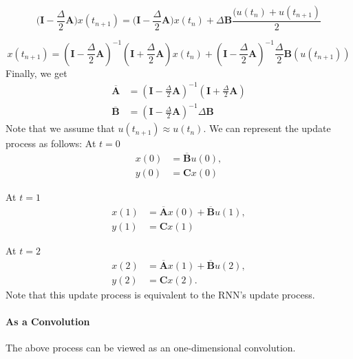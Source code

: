 \[ \bigg(\mathbf{I} - \frac{\Delta}{2} \mathbf{A}\bigg) x(t_{n+1}) = \bigg(\mathbf{I} - \frac{\Delta}{2} \mathbf{A}\bigg) x(t_n) + \Delta \mathbf{B} \frac{(u(t_n) + u(t_{n+1})}{2} \]

\[ x(t_{n+1}) = \left( \mathbf{I} - \frac{\Delta}{2} \mathbf{A} \right)^{-1} \left( \mathbf{I} + \frac{\Delta}{2} \mathbf{A} \right) x(t_n) + \left( \mathbf{I} - \frac{\Delta}{2} \mathbf{A} \right)^{-1} \frac{\Delta}{2} \mathbf{B} (u(t_{n+1})) \]
Finally, we get
\begin{align*}
	\overline{\mathbf{A}} &= \left( \mathbf{I} - \frac{\Delta}{2} \mathbf{A} \right)^{-1} \left( \mathbf{I} + \frac{\Delta}{2} \mathbf{A} \right)\\
	\overline{\mathbf{B}} &= \left( \mathbf{I} - \frac{\Delta}{2} \mathbf{A} \right)^{-1} \Delta \mathbf{B}
\end{align*}
Note that we assume that $u(t_{n+1})\approx u(t_{n}).$ We can represent the update process as follows:
At $t=0$
\begin{align*}
	x(0) &= \overline{\mathbf{B}}u(0),\\
	y(0) &= \mathbf{C}x(0)
\end{align*}

At $t=1$
\begin{align*}
	x(1) &= \overline{\mathbf{A}}x(0)+\overline{\mathbf{B}}u(1),\\
	y(1) &= \mathbf{C}x(1)
\end{align*}

At $t=2$
\begin{align*}
	x(2) &= \overline{\mathbf{A}}x(1)+\overline{\mathbf{B}}u(2),\\
	y(2) &= \mathbf{C}x(2).
\end{align*}
Note that this update process is equivalent to the RNN's update process. 

\paragraph{As a Convolution} 
The above process can be viewed as an one-dimensional convolution. 

